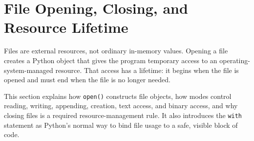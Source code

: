 \section{File Opening, Closing, and Resource Lifetime}

Files are external resources, not ordinary in-memory values. Opening a file creates a Python object that gives the program temporary access to an operating-system-managed resource. That access has a lifetime: it begins when the file is opened and must end when the file is no longer needed.

This section explains how \texttt{open()} constructs file objects, how modes control reading, writing, appending, creation, text access, and binary access, and why closing files is a required resource-management rule. It also introduces the \texttt{with} statement as Python's normal way to bind file usage to a safe, visible block of code.